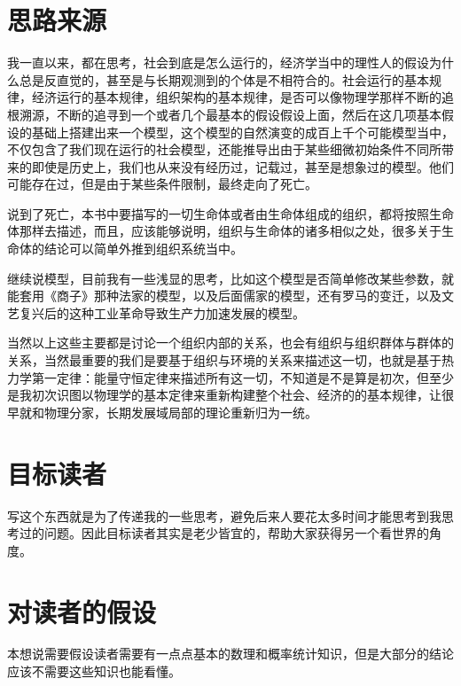 \section{思路来源}
我一直以来，都在思考，社会到底是怎么运行的，经济学当中的理性人的假设为什么总是反直觉的，甚至是与长期观测到的个体是不相符合的。社会运行的基本规律，经济运行的基本规律，组织架构的基本规律，是否可以像物理学那样不断的追根溯源，不断的追寻到一个或者几个最基本的假设假设上面，然后在这几项基本假设的基础上搭建出来一个模型，这个模型的自然演变的成百上千个可能模型当中，不仅包含了我们现在运行的社会模型，还能推导出由于某些细微初始条件不同所带来的即使是历史上，我们也从来没有经历过，记载过，甚至是想象过的模型。他们可能存在过，但是由于某些条件限制，最终走向了死亡。

说到了死亡，本书中要描写的一切生命体或者由生命体组成的组织，都将按照生命体那样去描述，而且，应该能够说明，组织与生命体的诸多相似之处，很多关于生命体的结论可以简单外推到组织系统当中。

继续说模型，目前我有一些浅显的思考，比如这个模型是否简单修改某些参数，就能套用《商子》那种法家的模型，以及后面儒家的模型，还有罗马的变迁，以及文艺复兴后的这种工业革命导致生产力加速发展的模型。

当然以上这些主要都是讨论一个组织内部的关系，也会有组织与组织群体与群体的关系，当然最重要的我们是要基于组织与环境的关系来描述这一切，也就是基于热力学第一定律：能量守恒定律来描述所有这一切，不知道是不是算是初次，但至少是我初次识图以物理学的基本定律来重新构建整个社会、经济的的基本规律，让很早就和物理分家，长期发展域局部的理论重新归为一统。


\section{目标读者}
写这个东西就是为了传递我的一些思考，避免后来人要花太多时间才能思考到我思考过的问题。因此目标读者其实是老少皆宜的，帮助大家获得另一个看世界的角度。

\section{对读者的假设}
本想说需要假设读者需要有一点点基本的数理和概率统计知识，但是大部分的结论应该不需要这些知识也能看懂。


